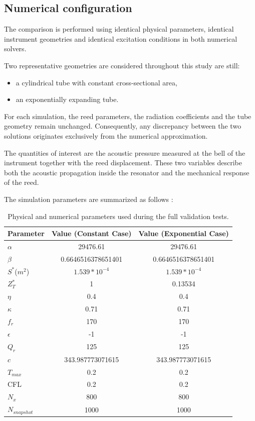 \documentclass[11pt,a4paper]{report}
\theoremstyle{plain}
\theoremstyle{definition}
\begin{document}
\subsection{Numerical configuration}

The comparison is performed using identical physical parameters, identical
instrument geometries and identical excitation conditions in both numerical
solvers.

Two representative geometries are considered throughout this study are still:

\begin{itemize}

\item a cylindrical tube with constant cross-sectional area,

\item an exponentially expanding tube.

\end{itemize}

For each simulation, the reed parameters, the radiation coefficients and the
tube geometry remain unchanged. Consequently, any discrepancy between the two
solutions originates exclusively from the numerical approximation.

The quantities of interest are the acoustic pressure measured at the bell of
the instrument together with the reed displacement. These two variables
describe both the acoustic propagation inside the resonator and the mechanical
response of the reed.

The simulation parameters are summarized as follows :


\begin{table}[htbp]
\centering
\begin{tabular}{|l|c|c|}
\hline
Parameter & Value (Constant Case) & Value (Exponential Case) \\
\hline
$\alpha$ & 29476.61 & 29476.61 \\
\hline
$\beta$ & 0.6646516378651401 & 0.6646516378651401 \\
\hline
$S^\ast$($m^2$) & $1.539*10^{-4}$ & $1.539*10^{-4}$ \\
\hline
$Z_T^\ast$ & 1 & 0.13534 \\
\hline
$\eta$ & 0.4 & 0.4 \\
\hline
$\kappa$ & 0.71 & 0.71 \\
\hline
$f_r$ & 170 & 170 \\
\hline
$\epsilon$ & -1 & -1 \\
\hline
$Q_r$ & 125 & 125 \\
\hline
$c$ & 343.987773071615 & 343.987773071615 \\
\hline
$T_{max}$ & 0.2 & 0.2 \\
\hline
CFL & 0.2 & 0.2 \\
\hline
$N_x$ & 800 & 800 \\
\hline
$N_{snapshot}$ & 1000 & 1000 \\
\hline
\end{tabular}
\caption{Physical and numerical parameters used during the full validation tests.}
\label{tab:full_validation_parameters}
\end{table}
\end{document}

